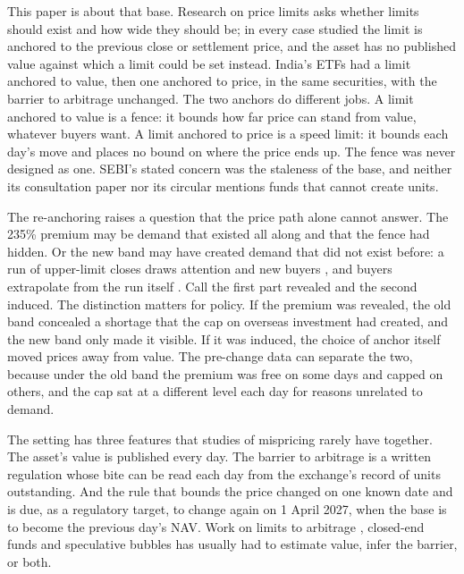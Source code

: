 \documentclass[11pt,a4paper]{article}
\theoremstyle{definition}
\begin{document}
This paper is about that base. Research on price limits asks whether limits should exist and how wide they should be; in every case studied the limit is anchored to the previous close or settlement price, and the asset has no published value against which a limit could be set instead. India's ETFs had a limit anchored to value, then one anchored to price, in the same securities, with the barrier to arbitrage unchanged. The two anchors do different jobs. A limit anchored to value is a fence: it bounds how far price can stand from value, whatever buyers want. A limit anchored to price is a speed limit: it bounds each day's move and places no bound on where the price ends up. The fence was never designed as one. SEBI's stated concern was the staleness of the base, and neither its consultation paper nor its circular mentions funds that cannot create units.

The re-anchoring raises a question that the price path alone cannot answer. The 235\% premium may be demand that existed all along and that the fence had hidden. Or the new band may have created demand that did not exist before: a run of upper-limit closes draws attention and new buyers \citep{seasholes2007predictable}, and buyers extrapolate from the run itself \citep{barberis2018extrapolation,pearson2021chinese}. Call the first part revealed and the second induced. The distinction matters for policy. If the premium was revealed, the old band concealed a shortage that the cap on overseas investment had created, and the new band only made it visible. If it was induced, the choice of anchor itself moved prices away from value. The pre-change data can separate the two, because under the old band the premium was free on some days and capped on others, and the cap sat at a different level each day for reasons unrelated to demand.

The setting has three features that studies of mispricing rarely have together. The asset's value is published every day. The barrier to arbitrage is a written regulation whose bite can be read each day from the exchange's record of units outstanding. And the rule that bounds the price changed on one known date and is due, as a regulatory target, to change again on 1 April 2027, when the base is to become the previous day's NAV. Work on limits to arbitrage \citep{shleifer1997limits}, closed-end funds \citep{lee1991investor} and speculative bubbles \citep{xiong2011chinese} has usually had to estimate value, infer the barrier, or both.
\end{document}
